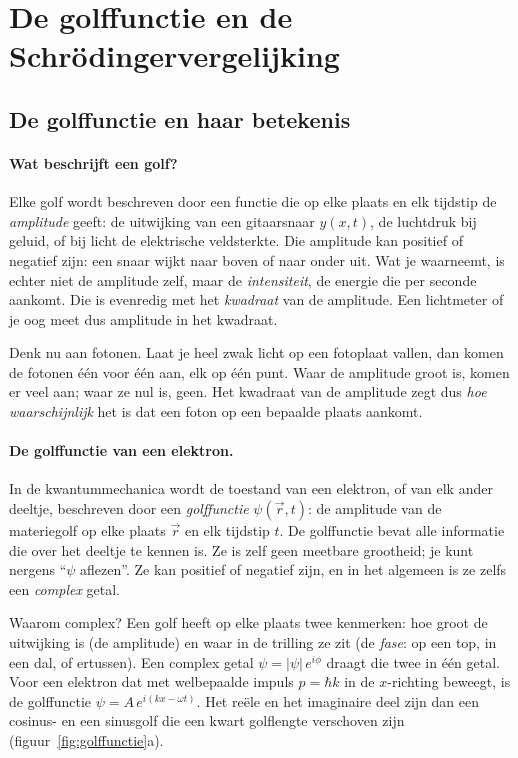 \section{De golffunctie en de Schr\"odingervergelijking}

\subsection{De golffunctie en haar betekenis}
\label{sec:golffunctie}

\paragraph{Wat beschrijft een golf?}
Elke golf wordt beschreven door een functie die op elke plaats en elk tijdstip de \emph{amplitude} geeft: de uitwijking van een gitaarsnaar $y(x,t)$, de luchtdruk bij geluid, of bij licht de elektrische veldsterkte. Die amplitude kan positief of negatief zijn: een snaar wijkt naar boven of naar onder uit. Wat je waarneemt, is echter niet de amplitude zelf, maar de \emph{intensiteit}, de energie die per seconde aankomt. Die is evenredig met het \emph{kwadraat} van de amplitude. Een lichtmeter of je oog meet dus amplitude in het kwadraat.

Denk nu aan fotonen. Laat je heel zwak licht op een fotoplaat vallen, dan komen de fotonen één voor één aan, elk op één punt. Waar de amplitude groot is, komen er veel aan; waar ze nul is, geen. Het kwadraat van de amplitude zegt dus \emph{hoe waarschijnlijk} het is dat een foton op een bepaalde plaats aankomt.

\paragraph{De golffunctie van een elektron.}
In de kwantummechanica wordt de toestand van een elektron, of van elk ander deeltje, beschreven door een \emph{golffunctie} $\psi(\vec r, t)$: de amplitude van de materiegolf op elke plaats $\vec r$ en elk tijdstip $t$. De golffunctie bevat alle informatie die over het deeltje te kennen is. Ze is zelf geen meetbare grootheid; je kunt nergens ``$\psi$ aflezen''. Ze kan positief of negatief zijn, en in het algemeen is ze zelfs een \emph{complex} getal.

Waarom complex? Een golf heeft op elke plaats twee kenmerken: hoe groot de uitwijking is (de amplitude) en waar in de trilling ze zit (de \emph{fase}: op een top, in een dal, of ertussen). Een complex getal $\psi = |\psi|\,e^{i\phi}$ draagt die twee in één getal. Voor een elektron dat met welbepaalde impuls $p = \hbar k$ in de $x$-richting beweegt, is de golffunctie $\psi = A\,e^{i(kx-\omega t)}$. Het reële en het imaginaire deel zijn dan een cosinus- en een sinusgolf die een kwart golflengte verschoven zijn (figuur~\ref{fig:golffunctie}a).

